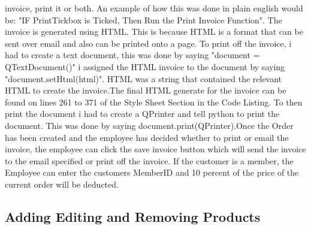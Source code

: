 invoice, print it or both. An example of how this was done in plain english would be: "IF PrintTickbox is Ticked, Then Run the Print Invoice Function". The invoice is generated using HTML. This is because HTML is a format that can be sent over email and also can be printed onto a page. To print off the invoice, i had to create a text document, this was done by saying "document = QTextDocument()" i assigned the HTML invoice to the document by saying "document.setHtml(html)". HTML was a string that contained the relevant HTML to create the invoice.The final HTML generate for the invoice can be found on lines 261 to 371 of the Style Sheet Section in the Code Listing. To then print the document i had to create a QPrinter and tell python to print the document. This was done by saying document.print(QPrinter).Once the Order has been created and the employee has decided whether to print or email the invoice, the employee can click the save invoice button which will send the invoice to the email specified or print off the invoice. If the customer is a member, the Employee can enter the customers MemberID and 10 percent of the price of the current order will be deducted.

\subsection{Adding Editing and Removing Products}

